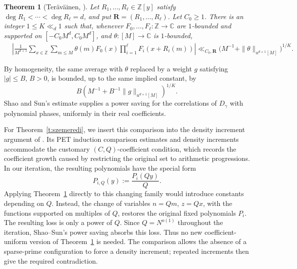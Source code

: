 \documentclass[12pt]{amsart}
\newcommand{\Z}{\mathbb Z}
\newcommand{\C}{\mathbb C}
\newcommand{\1}{\mathbf 1}
\newtheorem{theorem}{Theorem}[section]
\begin{document}
\begin{theorem}[Ter\"av\"ainen,
 {\cite[Theorem~4.1]{Teravainen}}]\label{t:teravainen}
Let $R_1,\ldots,R_\ell\in\Z[y]$ satisfy
$\deg R_1<\cdots<\deg R_\ell=d$, and put
$\mathbf R=(R_1,\ldots,R_\ell)$. Let $C_0\geq1$.
There is an integer $1\leq K\ll_d1$ such that, whenever
$F_0,\ldots,F_\ell:\Z\to\C$ are $1$-bounded and supported on
$[-C_0M^d,C_0M^d]$, and $\theta:[M]\to\C$ is $1$-bounded,
\begin{equation}\label{e:teravainen}
 \begin{aligned}
 &\left|\frac1{M^{d+1}}\sum_{x\in\Z}\sum_{m\leq M}
 \theta(m)F_0(x)\prod_{i=1}^{\ell}F_i(x+R_i(m))\right|\ll_{C_0,\mathbf R}
 \bigl(M^{-1}+\|\theta\|_{u^{d+1}[M]}\bigr)^{1/K}.
 \end{aligned}
\end{equation}
\end{theorem}

By homogeneity, the same average with $\theta$ replaced by a weight
$g$ satisfying $|g|\leq B$, $B>0$, is bounded, up to the same implied
constant, by
\begin{equation}\label{e:scaled-vn}
 B\left(M^{-1}+B^{-1}\|g\|_{u^{d+1}[M]}\right)^{1/K}.
\end{equation}
Shao and Sun's estimate \cite[Theorem~2.1]{ShaoSun} supplies a power
saving for the correlations of $D_\gamma$ with polynomial phases,
uniformly in their real coefficients. 

For Theorem~\ref{t:szemeredi}, we insert this comparison into the
density increment argument of \cite{KMTT}. Its PET induction comparison
estimates and density increments accommodate the customary
$(C,Q)$-coefficient condition, which records the coefficient growth
caused by restricting the original set to arithmetic progressions. In our iteration,
the resulting polynomials have the special form
\begin{equation}\label{e:rescaled-polynomial}
 P_{i,Q}(y):=\frac{P_i(Qy)}Q.
\end{equation}
Applying Theorem~\ref{t:teravainen} directly to this changing family
would introduce constants depending on $Q$. Instead, the change of
variables $n=Qm$, $z=Qx$, with the functions supported on multiples
of $Q$, restores the original fixed polynomials $P_i$.
The resulting loss is only a power of $Q$. Since $Q=N^{o(1)}$
throughout the iteration, Shao--Sun's power saving absorbs this
loss. Thus no new coefficient-uniform version of
Theorem~\ref{t:teravainen} is needed. The comparison allows the
absence of a sparse-prime configuration to force a density increment;
repeated increments then give the required contradiction.
\end{document}
